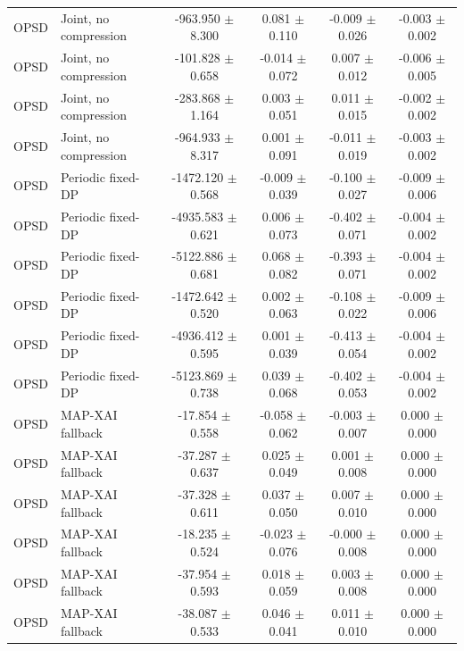 \begin{table}[t]
\begin{tabular}{llcccc}
OPSD & Joint, no compression & -963.950 $\pm$ 8.300 & 0.081 $\pm$ 0.110 & -0.009 $\pm$ 0.026 & -0.003 $\pm$ 0.002 \\
OPSD & Joint, no compression & -101.828 $\pm$ 0.658 & -0.014 $\pm$ 0.072 & 0.007 $\pm$ 0.012 & -0.006 $\pm$ 0.005 \\
OPSD & Joint, no compression & -283.868 $\pm$ 1.164 & 0.003 $\pm$ 0.051 & 0.011 $\pm$ 0.015 & -0.002 $\pm$ 0.002 \\
OPSD & Joint, no compression & -964.933 $\pm$ 8.317 & 0.001 $\pm$ 0.091 & -0.011 $\pm$ 0.019 & -0.003 $\pm$ 0.002 \\
OPSD & Periodic fixed-DP & -1472.120 $\pm$ 0.568 & -0.009 $\pm$ 0.039 & -0.100 $\pm$ 0.027 & -0.009 $\pm$ 0.006 \\
OPSD & Periodic fixed-DP & -4935.583 $\pm$ 0.621 & 0.006 $\pm$ 0.073 & -0.402 $\pm$ 0.071 & -0.004 $\pm$ 0.002 \\
OPSD & Periodic fixed-DP & -5122.886 $\pm$ 0.681 & 0.068 $\pm$ 0.082 & -0.393 $\pm$ 0.071 & -0.004 $\pm$ 0.002 \\
OPSD & Periodic fixed-DP & -1472.642 $\pm$ 0.520 & 0.002 $\pm$ 0.063 & -0.108 $\pm$ 0.022 & -0.009 $\pm$ 0.006 \\
OPSD & Periodic fixed-DP & -4936.412 $\pm$ 0.595 & 0.001 $\pm$ 0.039 & -0.413 $\pm$ 0.054 & -0.004 $\pm$ 0.002 \\
OPSD & Periodic fixed-DP & -5123.869 $\pm$ 0.738 & 0.039 $\pm$ 0.068 & -0.402 $\pm$ 0.053 & -0.004 $\pm$ 0.002 \\
OPSD & MAP-XAI fallback & -17.854 $\pm$ 0.558 & -0.058 $\pm$ 0.062 & -0.003 $\pm$ 0.007 & 0.000 $\pm$ 0.000 \\
OPSD & MAP-XAI fallback & -37.287 $\pm$ 0.637 & 0.025 $\pm$ 0.049 & 0.001 $\pm$ 0.008 & 0.000 $\pm$ 0.000 \\
OPSD & MAP-XAI fallback & -37.328 $\pm$ 0.611 & 0.037 $\pm$ 0.050 & 0.007 $\pm$ 0.010 & 0.000 $\pm$ 0.000 \\
OPSD & MAP-XAI fallback & -18.235 $\pm$ 0.524 & -0.023 $\pm$ 0.076 & -0.000 $\pm$ 0.008 & 0.000 $\pm$ 0.000 \\
OPSD & MAP-XAI fallback & -37.954 $\pm$ 0.593 & 0.018 $\pm$ 0.059 & 0.003 $\pm$ 0.008 & 0.000 $\pm$ 0.000 \\
OPSD & MAP-XAI fallback & -38.087 $\pm$ 0.533 & 0.046 $\pm$ 0.041 & 0.011 $\pm$ 0.010 & 0.000 $\pm$ 0.000 \\
\bottomrule
\end{tabular}
\end{table}
